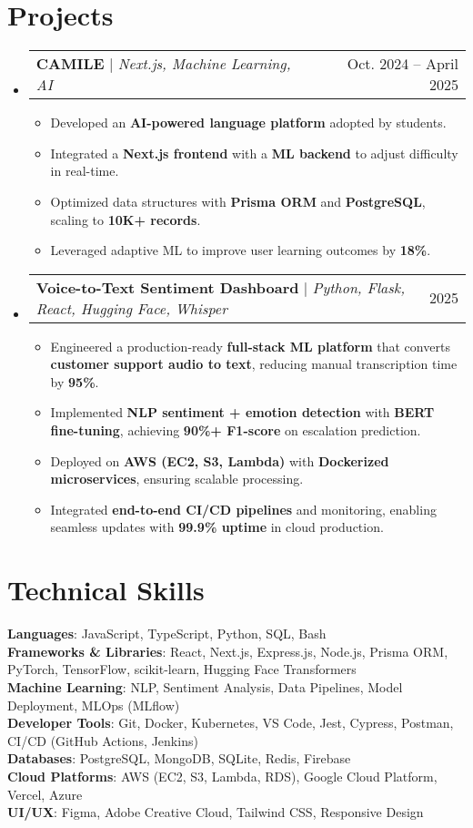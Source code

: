 \documentclass[letterpaper,11pt]{article}
\makeatletter
\newcommand{\resumeItem}[1]{
  \item\small{
    {#1 \vspace{-2pt}}
  }
}
\newcommand{\resumeProjectHeading}[2]{
    \item
    \begin{tabular*}{0.97\textwidth}{l@{\extracolsep{\fill}}r}
      \small#1 & #2 \\
    \end{tabular*}\vspace{-7pt}
}
\newcommand{\resumeItemListStart}{\begin{itemize}}
\newcommand{\resumeItemListEnd}{\end{itemize}\vspace{-5pt}}
\makeatother
\begin{document}
\section{Projects}
  \begin{itemize}[leftmargin=0.15in, label={}]
\resumeProjectHeading
  {\textbf{CAMILE} $|$ \emph{Next.js, Machine Learning, AI}}{Oct. 2024 -- April 2025}
  \resumeItemListStart
    \resumeItem{Developed an \textbf{AI-powered language platform} adopted by students.}
    \resumeItem{Integrated a \textbf{Next.js frontend} with a \textbf{ML backend} to adjust difficulty in real-time.}
    \resumeItem{Optimized data structures with \textbf{Prisma ORM} and \textbf{PostgreSQL}, scaling to \textbf{10K+ records}.}
    \resumeItem{Leveraged adaptive ML to improve user learning outcomes by \textbf{18\%}.}
  \resumeItemListEnd

\resumeProjectHeading
  {\textbf{Voice-to-Text Sentiment Dashboard} $|$ \emph{Python, Flask, React, Hugging Face, Whisper}}{2025}
  \resumeItemListStart
    \resumeItem{Engineered a production-ready \textbf{full-stack ML platform} that converts \textbf{customer support audio to text}, reducing manual transcription time by \textbf{95\%}.}
    \resumeItem{Implemented \textbf{NLP sentiment + emotion detection} with \textbf{BERT fine-tuning}, achieving \textbf{90\%+ F1-score} on escalation prediction.}
    \resumeItem{Deployed on \textbf{AWS (EC2, S3, Lambda)} with \textbf{Dockerized microservices}, ensuring scalable processing.}
    \resumeItem{Integrated \textbf{end-to-end CI/CD pipelines} and monitoring, enabling seamless updates with \textbf{99.9\% uptime} in cloud production.}
  \resumeItemListEnd
  \end{itemize}

\section{Technical Skills}
 \begin{itemize}[leftmargin=0.15in, label={}]
    \small{\item{
     \textbf{Languages}{: JavaScript, TypeScript, Python, SQL, Bash} \\
     \textbf{Frameworks \& Libraries}{: React, Next.js, Express.js, Node.js, Prisma ORM, PyTorch, TensorFlow, scikit-learn, Hugging Face Transformers} \\
     \textbf{Machine Learning}{: NLP, Sentiment Analysis, Data Pipelines, Model Deployment, MLOps (MLflow)} \\
     \textbf{Developer Tools}{: Git, Docker, Kubernetes, VS Code, Jest, Cypress, Postman, CI/CD (GitHub Actions, Jenkins)} \\
     \textbf{Databases}{: PostgreSQL, MongoDB, SQLite, Redis, Firebase} \\
     \textbf{Cloud Platforms}{: AWS (EC2, S3, Lambda, RDS), Google Cloud Platform, Vercel, Azure} \\
     \textbf{UI/UX}{: Figma, Adobe Creative Cloud, Tailwind CSS, Responsive Design} \\
    }}
 \end{itemize}


\end{document}

